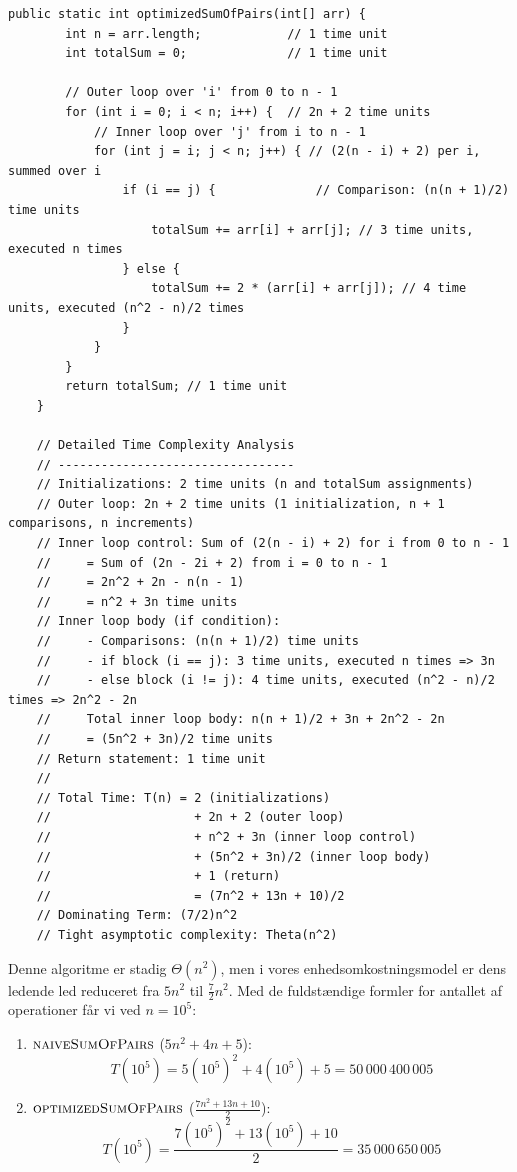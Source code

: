 \begin{lstlisting}[style = javaStyle, caption={Optimeret sum af par med analyse}, label={lst:java_optimized_sum_pairs_analysis}]
    public static int optimizedSumOfPairs(int[] arr) {
        int n = arr.length;            // 1 time unit
        int totalSum = 0;              // 1 time unit
    
        // Outer loop over 'i' from 0 to n - 1
        for (int i = 0; i < n; i++) {  // 2n + 2 time units
            // Inner loop over 'j' from i to n - 1
            for (int j = i; j < n; j++) { // (2(n - i) + 2) per i, summed over i
                if (i == j) {              // Comparison: (n(n + 1)/2) time units
                    totalSum += arr[i] + arr[j]; // 3 time units, executed n times
                } else {
                    totalSum += 2 * (arr[i] + arr[j]); // 4 time units, executed (n^2 - n)/2 times
                }
            }
        }
        return totalSum; // 1 time unit
    }
    
    // Detailed Time Complexity Analysis
    // ---------------------------------
    // Initializations: 2 time units (n and totalSum assignments)
    // Outer loop: 2n + 2 time units (1 initialization, n + 1 comparisons, n increments)
    // Inner loop control: Sum of (2(n - i) + 2) for i from 0 to n - 1
    //     = Sum of (2n - 2i + 2) from i = 0 to n - 1
    //     = 2n^2 + 2n - n(n - 1)
    //     = n^2 + 3n time units
    // Inner loop body (if condition): 
    //     - Comparisons: (n(n + 1)/2) time units
    //     - if block (i == j): 3 time units, executed n times => 3n
    //     - else block (i != j): 4 time units, executed (n^2 - n)/2 times => 2n^2 - 2n
    //     Total inner loop body: n(n + 1)/2 + 3n + 2n^2 - 2n
    //     = (5n^2 + 3n)/2 time units
    // Return statement: 1 time unit
    //
    // Total Time: T(n) = 2 (initializations)
    //                    + 2n + 2 (outer loop)
    //                    + n^2 + 3n (inner loop control)
    //                    + (5n^2 + 3n)/2 (inner loop body)
    //                    + 1 (return)
    //                    = (7n^2 + 13n + 10)/2
    // Dominating Term: (7/2)n^2
    // Tight asymptotic complexity: Theta(n^2)
\end{lstlisting}

Denne algoritme er stadig $\Theta(n^2)$, men i vores enhedsomkostningsmodel er dens ledende led reduceret fra $5n^2$ til $\tfrac{7}{2}n^2$. Med de fuldstændige formler for antallet af operationer får vi ved $n=10^5$:

\begin{enumerate}
    \item $\proc{naiveSumOfPairs}$ (\(5n^2+4n+5\)):
    \[
    T(10^5)=5(10^5)^2+4(10^5)+5=50\,000\,400\,005
    \]

    \item $\proc{optimizedSumOfPairs}$ (\(\tfrac{7n^2+13n+10}{2}\)):
    \[
    T(10^5)=\frac{7(10^5)^2+13(10^5)+10}{2}=35\,000\,650\,005
    \]
\end{enumerate}

